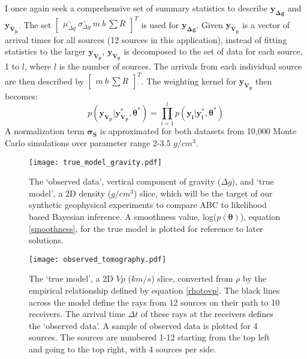 I once again seek a comprehensive set of summary statistics to describe $\bm{y_{\Delta g}}$ and $\bm{y_{V_p}}$. The set $\begin{bmatrix}
\bar{\mu_{\Delta g}}\ \bar{\sigma_{\Delta g}}\ m\ b\ \sum R
\end{bmatrix}^T$ is used for $\bm{y_{\Delta g}}$. Given $\bm{y_{V_p}}$ is a vector of arrival times for all sources (12 sources in this application), instead of fitting statistics to the larger $\bm{y_{V_p}}$, $\bm{y_{V_p}}$ is decomposed to the set of data for each source, 1 to $l$, where $l$ is the number of sources. The arrivals from each individual source are then described by $\begin{bmatrix}
m\ b\ \sum R
\end{bmatrix}^T$. The weighting kernel for $\bm{y_{V_p}}$ then becomes:
\begin{equation}
	p(\bm{y_{V_p}}|\bm{y^*_{V_p}},\bm{\theta^*}) = \prod_{i = 1}^{l} p(\bm{y_i}|\bm{y^*_i},\bm{\theta^*})
\end{equation}
A normalization term $\bm{\sigma_S}$ is approximated for both datasets from 10,000 Monte Carlo simulations over parameter range 2-3.5 $g/cm^3$. \par

\begin{figure}[H]
	\centering
	\texttt{[image: true\_model\_gravity.pdf]}
	\caption{The `observed data', vertical component of gravity ($\Delta g$), and `true model', a 2D density ($g/cm^3$) slice, which will be the target of our synthetic geophysical experiments to compare ABC to likelihood based Bayesian inference. A smoothness value, log($p(\bm{\theta})$), equation \ref{smoothness}, for the true model is plotted for reference to later solutions.}
	\label{true-model-large-grav}
\end{figure}

\begin{figure}[H]
	\centering
	\texttt{[image: observed\_tomography.pdf]}
	\caption{The `true model', a 2D $Vp$ ($km/s$) slice, converted from $\rho$ by the empirical relationship defined by equation \ref{rhotovp}. The black lines across the model define the rays from 12 sources on their path to 10 receivers. The arrival time $\Delta t$ of these rays at the receivers defines the `observed data'. A sample of observed data is plotted for 4 sources. The sources are numbered 1-12 starting from the top left and going to the top right, with 4 sources per side.}
	\label{true-model-tom}
\end{figure}

